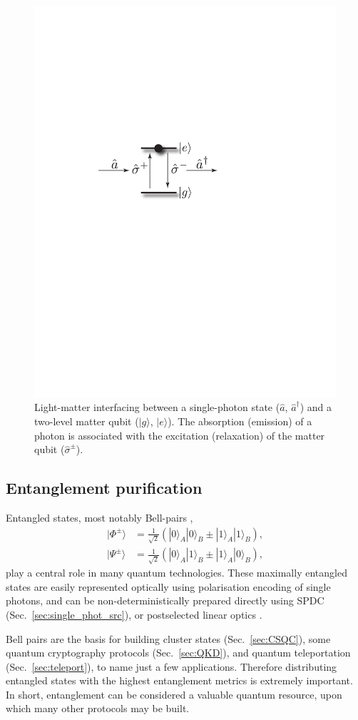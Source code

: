\documentclass[aps,rmp,twocolumn,amsmath,amssymb,nofootinbib,superscriptaddress,longbibliography,floatfix]{revtex4-1}
\newcommand{\ket}[1]{|#1\rangle}
\begin{document}
\begin{figure}[!htb]
\includegraphics[width=0.6\columnwidth]{opt_inter}
\caption{Light-matter interfacing between a single-photon state ($\hat{a}$, $\hat{a}^\dag$) and a two-level matter qubit ($\ket{g}$, $\ket{e}$). The absorption (emission) of a photon is associated with the excitation (relaxation) of the matter qubit ($\hat\sigma^\pm$).} \label{fig:opt_int}
\end{figure}

%
%

\subsection{Entanglement purification} \label{sec:ent_purif}

Entangled states, most notably Bell-pairs \cite{???},
\begin{align} \label{eq:bell_basis}
\ket{\Phi^{\pm}} &= \frac{1}{\sqrt{2}} (\ket{0}_A\ket{0}_B \pm \ket{1}_A\ket{1}_B), \nonumber \\
\ket{\Psi^{\pm}} &= \frac{1}{\sqrt{2}} (\ket{0}_A\ket{1}_B \pm \ket{1}_A\ket{0}_B),
\end{align}
play a central role in many quantum technologies. These maximally entangled states are easily represented optically using polarisation encoding of single photons, and can be non-deterministically prepared directly using SPDC (Sec.~\ref{sec:single_phot_src}), or postselected linear optics \cite{???}.

Bell pairs are the basis for building cluster states (Sec.~\ref{sec:CSQC}), some quantum cryptography protocols (Sec.~\ref{sec:QKD}), and quantum teleportation (Sec.~\ref{sec:teleport}), to name just a few applications. Therefore distributing entangled states with the highest entanglement metrics is extremely important. In short, entanglement can be considered a valuable quantum resource, upon which many other protocols may be built.
\end{document}
